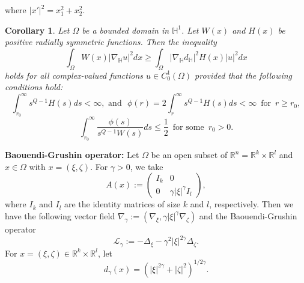 \documentclass[a4paper,12pt,reqno]{amsart}
\theoremstyle{theorem}
\numberwithin{equation}{section}
\theoremstyle{plain}
\newtheorem{cor}[thm]{Corollary}
\theoremstyle{definition}
\theoremstyle{defi}
\begin{document}
where $|x'|^2 = x_1^2+ x_2^2$.
\begin{cor}\label{cor_H}
	Let $\Omega$ be a bounded domain in $\mathbb{H}^1$. Let $W(x)$ and $H(x)$ be positive radially symmetric functions. Then the inequality 
	\begin{equation}
	\int_{\Omega} W(x) |\nabla_{\mathbb{H}} u|^2 dx \geq \int_{\Omega} |\nabla_{\mathbb{H}} d_{\mathbb{H}}|^2 H(x) |u|^2 dx
	\end{equation}
	holds for all complex-valued functions $u \in C^1_0(\Omega)$ provided that the following conditions hold: 
	\begin{equation}
	\int_{r_0}^{\infty} s^{Q-1}H(s) ds< \infty, \,\, \text{and} \,\, \,\,	\phi(r) = 2 \int_{r}^{\infty} s^{Q-1}H(s) ds < \infty \,\,\, \text{for} \,\,\, r\geq r_0,
	\end{equation}
	\begin{equation}
	\int_{r_0}^{\infty}  \frac{\phi(s)}{s^{Q-1}W(s)} ds  \leq \frac{1}{2} \,\,\, \text{for some} \,\,\, r_0>0.
	\end{equation}
\end{cor}

\medskip	
{\bf Baouendi-Grushin operator:} 	Let $\Omega$ be an open subset of $\mathbb{R}^n=\mathbb{R}^k\times \mathbb{R}^l$ and $x\in \Omega$ with $x = (\xi,\zeta)$. For $\gamma>0$, we take  
	$$A(x):=\begin{pmatrix}
	I_k & 0\\ 0 &\gamma|\xi|^{\gamma}I_l
	\end{pmatrix},$$
	where $I_k$ and $I_l$ are the identity matrices of size $k$ and $l$, respectively. Then we have the following vector field $\nabla_{\gamma}:= (\nabla_{\xi}, \gamma|\xi|^{\gamma}\nabla_{\zeta})$ and the Baouendi-Grushin operator 
	$$\mathcal{L}_{\gamma}:= -\Delta_{\xi}-\gamma^2|\xi|^{2\gamma}\Delta_{\zeta}.$$
	For $x = (\xi,\zeta) \in \mathbb{R}^k\times \mathbb{R}^l$, let 
	\begin{equation*}
	d_{\gamma}(x) = (|\xi|^{2\gamma} + |\zeta|^2)^{1/2\gamma}.
	\end{equation*}
	
\end{document}
